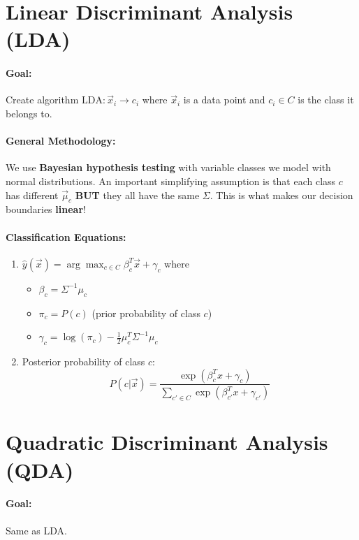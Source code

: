 \documentclass[a4paper,12pt]{report}
\begin{document}
\section{Linear Discriminant Analysis (LDA)}

\paragraph{Goal: } Create algorithm $\text{LDA}: \vec x_i \to c_i$ where $\vec x_i$ is a data point and $c_i\in C$ is the class it belongs to.

\paragraph{General Methodology: } We use \textbf{Bayesian hypothesis testing} with variable classes we model with normal distributions. An important simplifying assumption is that each class $c$ has different $\vec \mu_c$ \textbf{BUT} they all have the same $\Sigma$. This is what makes our decision boundaries \textbf{linear}!

\paragraph{Classification Equations: } 
\begin{enumerate}
\item $\hat y(\vec x) = \arg\max_{c\in C} \beta_c^T \vec x + \gamma_c$ where
\begin{itemize}
\item $\beta_c = \Sigma^{-1} \mu_c$
\item $\pi_c = P(c)$ (prior probability of class $c$)
\item $\gamma_c = \log(\pi_c) - \frac{1}{2} \mu_c^T \Sigma^{-1} \mu_c$
\end{itemize}

\item Posterior probability of class $c$: 
\begin{equation}
P(c | \vec x) = \frac{\exp(\beta_c^T x + \gamma_c)}{\sum_{c'\in C}^{} \exp(\beta_{c'}^T x + \gamma_{c'})} 
\end{equation}
\end{enumerate}


\section{Quadratic Discriminant Analysis (QDA)}

\paragraph{Goal: } Same as LDA. 
\end{document}
